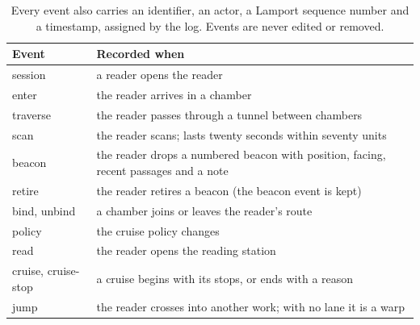 \documentclass[11pt]{article}
\theoremstyle{remark}
\begin{document}
\begin{table}[h]
\centering\small
\begin{tabularx}{\linewidth}{>{\ttfamily}lX}
\toprule
\normalfont Event & Recorded when \\
\midrule
session & a reader opens the reader \\
enter & the reader arrives in a chamber \\
traverse & the reader passes through a tunnel between chambers \\
scan & the reader scans; lasts twenty seconds within seventy units \\
beacon & the reader drops a numbered beacon with position, facing, recent passages and a note \\
retire & the reader retires a beacon (the beacon event is kept) \\
bind, unbind & a chamber joins or leaves the reader's route \\
policy & the cruise policy changes \\
read & the reader opens the reading station \\
cruise, cruise-stop & a cruise begins with its stops, or ends with a reason \\
jump & the reader crosses into another work; with no lane it is a warp \\
\bottomrule
\end{tabularx}
\caption{Every event also carries an identifier, an actor, a Lamport sequence number and a timestamp, assigned by the log. Events are never edited or removed.}
\end{table}
\end{document}
